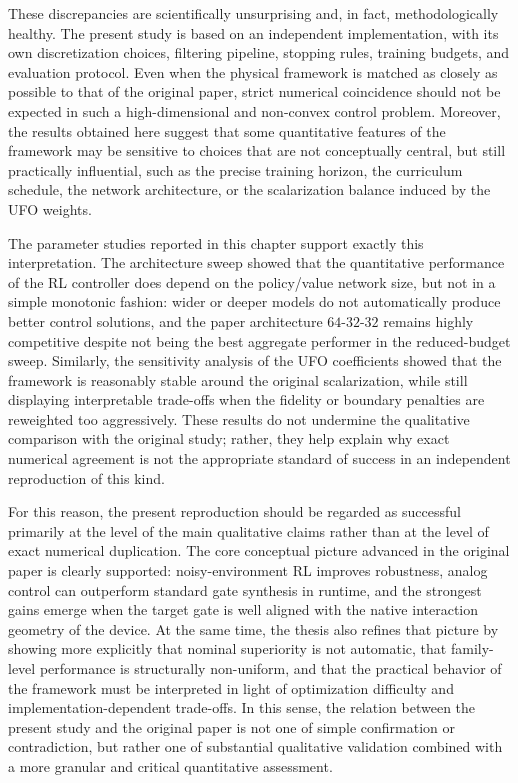 These discrepancies are scientifically unsurprising and, in fact, methodologically healthy. The present study is based on an independent implementation, with its own discretization choices, filtering pipeline, stopping rules, training budgets, and evaluation protocol. Even when the physical framework is matched as closely as possible to that of the original paper, strict numerical coincidence should not be expected in such a high-dimensional and non-convex control problem. Moreover, the results obtained here suggest that some quantitative features of the framework may be sensitive to choices that are not conceptually central, but still practically influential, such as the precise training horizon, the curriculum schedule, the network architecture, or the scalarization balance induced by the UFO weights.

The parameter studies reported in this chapter support exactly this interpretation. The architecture sweep showed that the quantitative performance of the RL controller does depend on the policy/value network size, but not in a simple monotonic fashion: wider or deeper models do not automatically produce better control solutions, and the paper architecture \(64\text{-}32\text{-}32\) remains highly competitive despite not being the best aggregate performer in the reduced-budget sweep. Similarly, the sensitivity analysis of the UFO coefficients showed that the framework is reasonably stable around the original scalarization, while still displaying interpretable trade-offs when the fidelity or boundary penalties are reweighted too aggressively. These results do not undermine the qualitative comparison with the original study; rather, they help explain why exact numerical agreement is not the appropriate standard of success in an independent reproduction of this kind.

For this reason, the present reproduction should be regarded as successful primarily at the level of the main qualitative claims rather than at the level of exact numerical duplication. The core conceptual picture advanced in the original paper is clearly supported: noisy-environment RL improves robustness, analog control can outperform standard gate synthesis in runtime, and the strongest gains emerge when the target gate is well aligned with the native interaction geometry of the device. At the same time, the thesis also refines that picture by showing more explicitly that nominal superiority is not automatic, that family-level performance is structurally non-uniform, and that the practical behavior of the framework must be interpreted in light of optimization difficulty and implementation-dependent trade-offs. In this sense, the relation between the present study and the original paper is not one of simple confirmation or contradiction, but rather one of substantial qualitative validation combined with a more granular and critical quantitative assessment.

